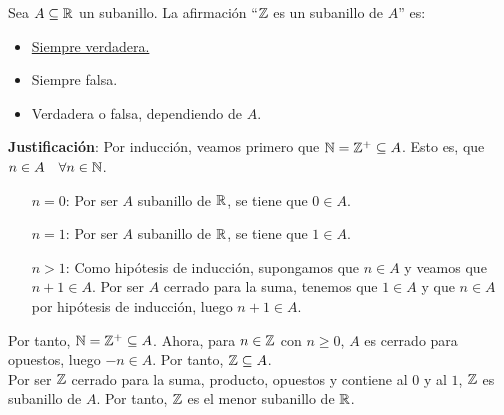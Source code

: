 \begin{ejercicio}
    Sea $A \subseteq \mathbb{R}$ un subanillo. La afirmación ``$\mathbb{Z}$ es un subanillo de $A$'' es:
    \begin{itemize}
        \item \underline{Siempre verdadera.}
        \item Siempre falsa.
        \item Verdadera o falsa, dependiendo de $A$.
    \end{itemize}

    \noindent
    \textbf{Justificación}:
    Por inducción, veamos primero que $\mathbb{N} = \mathbb{Z}^{+} \subseteq A$.\newline
    Esto es, que $n \in A\quad\forall n \in \mathbb{N}$.
    \begin{enumerate}
        \item [$n=0$:]
            Por ser $A$ subanillo de $\mathbb{R}$, se tiene que $0 \in A$.
        \item [$n=1$:]
            Por ser $A$ subanillo de $\mathbb{R}$, se tiene que $1 \in A$.
        \item [$n>1$:]
            Como hipótesis de inducción, supongamos que $n \in A$ y veamos que $n+1 \in A$.\newline
            Por ser $A$ cerrado para la suma, tenemos que $1 \in A$ y que $n \in A$ por hipótesis de inducción, luego $n+1 \in A$.
    \end{enumerate}
    Por tanto, $\mathbb{N} = \mathbb{Z}^{+} \subseteq A$.\newline
    Ahora, para $n \in \mathbb{Z}$ con $n \geq 0$, $A$ es cerrado para opuestos, luego $-n \in A$.\newline
    Por tanto, $\mathbb{Z} \subseteq A$.\\

    \noindent
    Por ser $\mathbb{Z}$ cerrado para la suma, producto, opuestos y contiene al $0$ y al $1$, $\mathbb{Z}$ es subanillo de $A$. Por tanto, $\mathbb{Z}$ es el menor subanillo de $\mathbb{R}$.
\end{ejercicio}

\newpage
\resetearcontador

